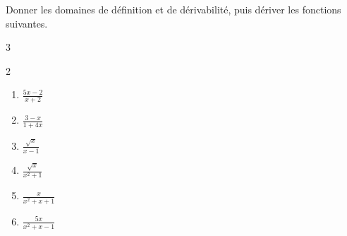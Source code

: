\documentclass[main.tex]{subfiles}
\begin{document}
\begin{exercise} \label{chapter06:exercice:derivation:operation05}
Donner les domaines de définition et de dérivabilité, puis dériver les fonctions suivantes.
\vspace{-1em}
\begin{multicols}{3}
	\begin{spacing}{2} 
		\begin{enumerate}[label={\arabic*)$f(x)=$}, leftmargin=*]
			\item $\frac{5x-2}{x+2}$
			\item $\frac{3-x}{1+4x}$
			\item $\frac{\sqrt{x}}{x-1}$
			\item $\frac{\sqrt{x}}{x^2+1}$
			\item $\frac{x}{x^2+x+1}$
			\item $\frac{5x}{x^2+x-1}$
		\end{enumerate} 
	\end{spacing}
\end{multicols}  
\end{exercise}
\end{document}
